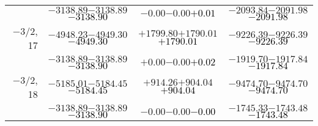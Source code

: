 \documentclass[compress]{beamer}
\begin{document}
\begin{frame}
{\begin{tabular}{r | c | c | c}
           & $-3138.89$\hspace{0.1 cm}$-3138.89$\hspace{0.1 cm}\textcolor{black}{$-3138.90$} & $-0.00$\hspace{0.1 cm}$-0.00$\hspace{0.1 cm}\textcolor{black}{$+0.01$} & $-2093.84$\hspace{0.1 cm}$-2091.98$\hspace{0.1 cm}\textcolor{black}{$-2091.98$} \\
$-$3/2, 17 & $-4948.23$\hspace{0.1 cm}$-4949.30$\hspace{0.1 cm}\textcolor{black}{$-4949.30$} & $+1799.80$\hspace{0.1 cm}$+1790.01$\hspace{0.1 cm}\textcolor{black}{$+1790.01$} & $-9226.39$\hspace{0.1 cm}$-9226.39$\hspace{0.1 cm}\textcolor{black}{$-9226.39$} \\
           & $-3138.89$\hspace{0.1 cm}$-3138.89$\hspace{0.1 cm}\textcolor{black}{$-3138.90$} & $+0.00$\hspace{0.1 cm}$-0.00$\hspace{0.1 cm}\textcolor{black}{$+0.02$} & $-1919.70$\hspace{0.1 cm}$-1917.84$\hspace{0.1 cm}\textcolor{black}{$-1917.84$} \\
$-$3/2, 18 & $-5185.01$\hspace{0.1 cm}$-5184.45$\hspace{0.1 cm}\textcolor{black}{$-5184.45$} & $+914.26$\hspace{0.1 cm}$+904.04$\hspace{0.1 cm}\textcolor{black}{$+904.04$} & $-9474.70$\hspace{0.1 cm}$-9474.70$\hspace{0.1 cm}\textcolor{black}{$-9474.70$} \\
           & $-3138.89$\hspace{0.1 cm}$-3138.89$\hspace{0.1 cm}\textcolor{black}{$-3138.90$} & $-0.00$\hspace{0.1 cm}$-0.00$\hspace{0.1 cm}\textcolor{black}{$-0.00$} & $-1745.33$\hspace{0.1 cm}$-1743.48$\hspace{0.1 cm}\textcolor{black}{$-1743.48$} \\
\end{tabular}}
\end{frame}
\end{document}
